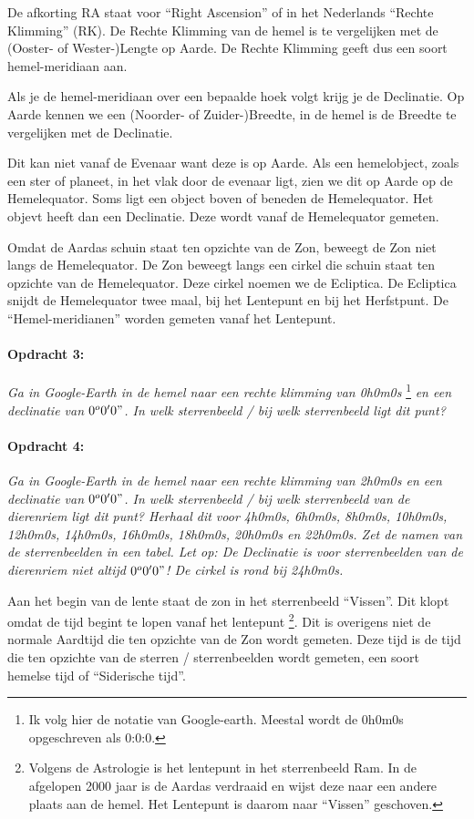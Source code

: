 De afkorting RA staat voor ``Right Ascension'' of in het Nederlands
``Rechte Klimming'' (RK). De Rechte Klimming van de hemel is te
vergelijken met de (Ooster- of Wester-)Lengte op Aarde. De Rechte
Klimming geeft dus een soort hemel-meridiaan aan.

Als je de hemel-meridiaan over een bepaalde hoek volgt krijg je de
Declinatie. Op Aarde kennen we een (Noorder- of Zuider-)Breedte, in
de hemel is de Breedte te vergelijken met de Declinatie. 

Dit kan niet vanaf de Evenaar want deze is op Aarde. Als een hemelobject,
zoals een ster of planeet, in het vlak door de evenaar ligt, zien
we dit op Aarde op de Hemelequator. Soms ligt een object boven of
beneden de Hemelequator. Het objevt heeft dan een Declinatie. Deze
wordt vanaf de Hemelequator gemeten.

Omdat de Aardas schuin staat ten opzichte van de Zon, beweegt de Zon
niet langs de Hemelequator. De Zon beweegt langs een cirkel die schuin
staat ten opzichte van de Hemelequator. Deze cirkel noemen we de Ecliptica.
De Ecliptica snijdt de Hemelequator twee maal, bij het Lentepunt en
bij het Herfstpunt. De ``Hemel-meridianen'' worden gemeten vanaf
het Lentepunt.


\paragraph*{Opdracht 3:}

\emph{Ga in Google-Earth in de hemel naar een rechte klimming van
0h0m0s} \footnote{Ik volg hier de notatie van Google-earth. Meestal
wordt de 0h0m0s opgeschreven als 0:0:0.}\emph{ en een declinatie van
$0^{o}0'0"$. In welk sterrenbeeld / bij welk sterrenbeeld ligt dit punt?
}


\paragraph*{Opdracht 4:}

\emph{Ga in Google-Earth in de hemel naar een rechte klimming van
2h0m0s en een declinatie van $0^{o}0'0"$. In welk sterrenbeeld /
bij welk sterrenbeeld van de dierenriem ligt dit punt? Herhaal dit
voor 4h0m0s, 6h0m0s, 8h0m0s, 10h0m0s, 12h0m0s, 14h0m0s, 16h0m0s, 18h0m0s,
20h0m0s en 22h0m0s. Zet de namen van de sterrenbeelden in een tabel.
Let op: De Declinatie is voor sterrenbeelden van de dierenriem niet
altijd $0^{o}0'0"$! De cirkel is rond bij 24h0m0s.}

Aan het begin van de lente staat de zon in het sterrenbeeld ``Vissen''.
Dit klopt omdat de tijd begint te lopen vanaf het lentepunt
\footnote{Volgens de Astrologie is het lentepunt in het sterrenbeeld
Ram. In de afgelopen 2000 jaar is de Aardas verdraaid en wijst deze naar
een andere plaats aan de hemel. Het Lentepunt is daarom naar ``Vissen''
geschoven.}. Dit is overigens niet de normale Aardtijd die ten opzichte
van de Zon wordt gemeten. Deze tijd is de tijd die ten opzichte van de
sterren / sterrenbeelden wordt gemeten, een soort hemelse tijd of
``Siderische tijd''.


